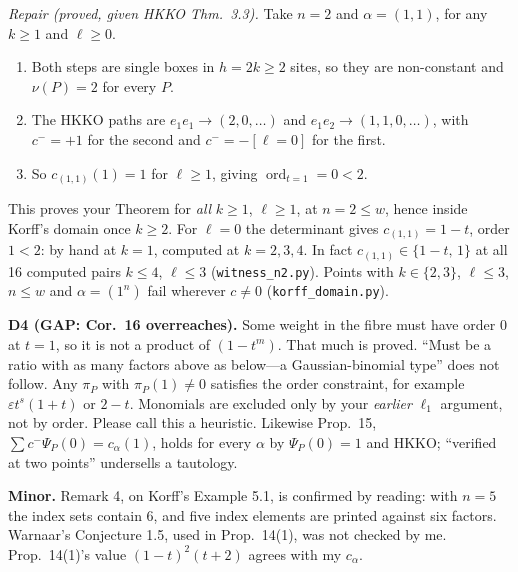 \documentclass[10pt]{article}
\newcommand{\ord}{\operatorname{ord}_{t=1}}
\begin{document}
\emph{Repair (proved, given HKKO Thm.~3.3).} Take $n=2$ and $\alpha=(1,1)$, for any $k\ge1$ and $\ell\ge0$.
\begin{enumerate}
\item Both steps are single boxes in $h=2k\ge2$ sites, so they are non-constant and $\nu(P)=2$ for every $P$.
\item The HKKO paths are $e_1e_1\to(2,0,\dots)$ and $e_1e_2\to(1,1,0,\dots)$, with $c^-=+1$ for the second and $c^-=-[\ell=0]$ for the first.
\item So $c_{(1,1)}(1)=1$ for $\ell\ge1$, giving $\ord=0<2$.
\end{enumerate}
This proves your Theorem for \emph{all} $k\ge1$, $\ell\ge1$, at $n=2\le w$, hence inside Korff's domain once
$k\ge2$. For $\ell=0$ the determinant gives $c_{(1,1)}=1-t$, order $1<2$: by hand at $k=1$, computed at $k=2,3,4$.
In fact $c_{(1,1)}\in\{1-t,\,1\}$ at all 16 computed pairs $k\le4$, $\ell\le3$ (\texttt{witness\_n2.py}). Points with
$k\in\{2,3\}$, $\ell\le3$, $n\le w$ and $\alpha=(1^n)$ fail wherever $c\ne0$ (\texttt{korff\_domain.py}).

\textbf{D4 (GAP: Cor.~16 overreaches).} Some weight in the fibre must have order $0$ at $t=1$, so it is not a
product of $(1-t^m)$. That much is proved. ``Must be a ratio with as many factors above as below---a
Gaussian-binomial type'' does not follow. Any $\pi_P$ with $\pi_P(1)\ne0$ satisfies the order constraint, for
example $\varepsilon t^s(1+t)$ or $2-t$. Monomials are excluded only by your \emph{earlier} $\ell_1$ argument, not
by order. Please call this a heuristic. Likewise Prop.~15, $\sum c^-\Psi_P(0)=c_\alpha(1)$, holds for every $\alpha$
by $\Psi_P(0)=1$ and HKKO; ``verified at two points'' undersells a tautology.

\textbf{Minor.} Remark 4, on Korff's Example 5.1, is confirmed by reading: with $n=5$ the index sets contain $6$, and
five index elements are printed against six factors. Warnaar's Conjecture 1.5, used in Prop.~14(1), was not checked
by me. Prop.~14(1)'s value $(1-t)^2(t+2)$ agrees with my $c_\alpha$.
\end{document}
